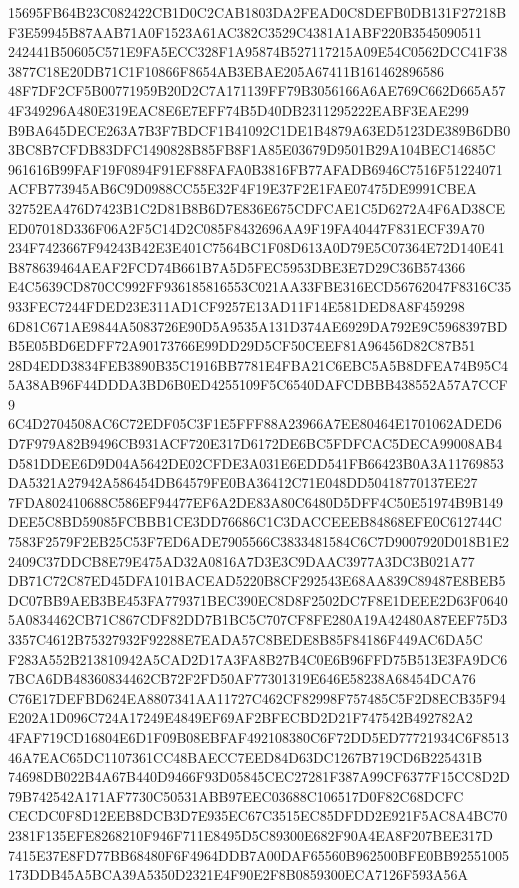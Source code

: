 \documentclass[UTF8,fontset=fandol,zihao=-4,a4paper]{ctexart}
\begin{document}
{{15695FB64B23C082422CB1D0C2CAB1803DA2FEAD0C8DEFB0DB131F27218BF3E59945B87AAB71A0F1523A61AC382C3529C4381A1ABF220B3545090511
242441B50605C571E9FA5ECC328F1A95874B527117215A09E54C0562DCC41F383877C18E20DB71C1F10866F8654AB3EBAE205A67411B161462896586
48F7DF2CF5B00771959B20D2C7A171139FF79B3056166A6AE769C662D665A574F349296A480E319EAC8E6E7EFF74B5D40DB2311295222EABF3EAE299
B9BA645DECE263A7B3F7BDCF1B41092C1DE1B4879A63ED5123DE389B6DB03BC8B7CFDB83DFC1490828B85FB8F1A85E03679D9501B29A104BEC14685C
961616B99FAF19F0894F91EF88FAFA0B3816FB77AFADB6946C7516F51224071ACFB773945AB6C9D0988CC55E32F4F19E37F2E1FAE07475DE9991CBEA
32752EA476D7423B1C2D81B8B6D7E836E675CDFCAE1C5D6272A4F6AD38CEED07018D336F06A2F5C14D2C085F8432696AA9F19FA40447F831ECF39A70
234F7423667F94243B42E3E401C7564BC1F08D613A0D79E5C07364E72D140E41B878639464AEAF2FCD74B661B7A5D5FEC5953DBE3E7D29C36B574366
E4C5639CD870CC992FF936185816553C021AA33FBE316ECD56762047F8316C35933FEC7244FDED23E311AD1CF9257E13AD11F14E581DED8A8F459298
6D81C671AE9844A5083726E90D5A9535A131D374AE6929DA792E9C5968397BDB5E05BD6EDFF72A90173766E99DD29D5CF50CEEF81A96456D82C87B51
28D4EDD3834FEB3890B35C1916BB7781E4FBA21C6EBC5A5B8DFEA74B95C45A38AB96F44DDDA3BD6B0ED4255109F5C6540DAFCDBBB438552A57A7CCF9
6C4D2704508AC6C72EDF05C3F1E5FFF88A23966A7EE80464E1701062ADED6D7F979A82B9496CB931ACF720E317D6172DE6BC5FDFCAC5DECA99008AB4
D581DDEE6D9D04A5642DE02CFDE3A031E6EDD541FB66423B0A3A11769853DA5321A27942A586454DB64579FE0BA36412C71E048DD50418770137EE27
7FDA802410688C586EF94477EF6A2DE83A80C6480D5DFF4C50E51974B9B149DEE5C8BD59085FCBBB1CE3DD76686C1C3DACCEEEB84868EFE0C612744C
7583F2579F2EB25C53F7ED6ADE7905566C3833481584C6C7D9007920D018B1E22409C37DDCB8E79E475AD32A0816A7D3E3C9DAAC3977A3DC3B021A77
DB71C72C87ED45DFA101BACEAD5220B8CF292543E68AA839C89487E8BEB5DC07BB9AEB3BE453FA779371BEC390EC8D8F2502DC7F8E1DEEE2D63F0640
5A0834462CB71C867CDF82DD7B1BC5C707CF8FE280A19A42480A87EEF75D33357C4612B75327932F92288E7EADA57C8BEDE8B85F84186F449AC6DA5C
F283A552B213810942A5CAD2D17A3FA8B27B4C0E6B96FFD75B513E3FA9DC67BCA6DB48360834462CB72F2FD50AF77301319E646E58238A68454DCA76
C76E17DEFBD624EA8807341AA11727C462CF82998F757485C5F2D8ECB35F94E202A1D096C724A17249E4849EF69AF2BFECBD2D21F747542B492782A2
4FAF719CD16804E6D1F09B08EBFAF492108380C6F72DD5ED77721934C6F851346A7EAC65DC1107361CC48BAECC7EED84D63DC1267B719CD6B225431B
74698DB022B4A67B440D9466F93D05845CEC27281F387A99CF6377F15CC8D2D79B742542A171AF7730C50531ABB97EEC03688C106517D0F82C68DCFC
CECDC0F8D12EEB8DCB3D7E935EC67C3515EC85DFDD2E921F5AC8A4BC702381F135EFE8268210F946F711E8495D5C89300E682F90A4EA8F207BEE317D
7415E37E8FD77BB68480F6F4964DDB7A00DAF65560B962500BFE0BB92551005173DDB45A5BCA39A5350D2321E4F90E2F8B0859300ECA7126F593A56A
}}
\end{document}
